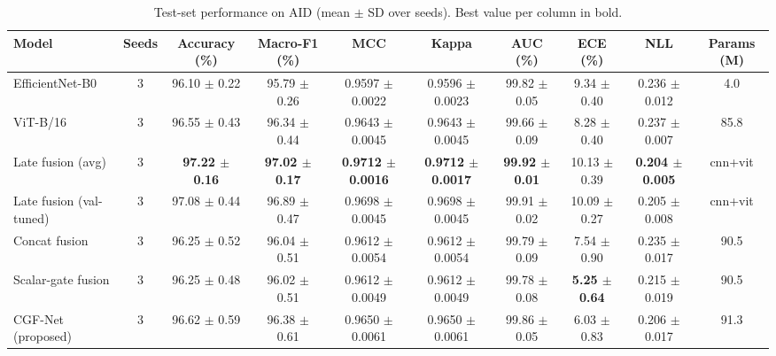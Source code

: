 \begin{table}[t]
\centering
\small
\caption{Test-set performance on AID (mean $\pm$ SD over seeds). Best value per column in bold.}
\label{tab:main}
\begin{tabular}{lccccccccc}
\toprule
Model & Seeds & Accuracy (\%) & Macro-F1 (\%) & MCC & Kappa & AUC (\%) & ECE (\%) & NLL & Params (M) \\
\midrule
EfficientNet-B0 & 3 & 96.10 $\pm$ 0.22 & 95.79 $\pm$ 0.26 & 0.9597 $\pm$ 0.0022 & 0.9596 $\pm$ 0.0023 & 99.82 $\pm$ 0.05 & 9.34 $\pm$ 0.40 & 0.236 $\pm$ 0.012 & 4.0 \\
ViT-B/16 & 3 & 96.55 $\pm$ 0.43 & 96.34 $\pm$ 0.44 & 0.9643 $\pm$ 0.0045 & 0.9643 $\pm$ 0.0045 & 99.66 $\pm$ 0.09 & 8.28 $\pm$ 0.40 & 0.237 $\pm$ 0.007 & 85.8 \\
Late fusion (avg) & 3 & \textbf{97.22 $\pm$ 0.16} & \textbf{97.02 $\pm$ 0.17} & \textbf{0.9712 $\pm$ 0.0016} & \textbf{0.9712 $\pm$ 0.0017} & \textbf{99.92 $\pm$ 0.01} & 10.13 $\pm$ 0.39 & \textbf{0.204 $\pm$ 0.005} & cnn+vit \\
Late fusion (val-tuned) & 3 & 97.08 $\pm$ 0.44 & 96.89 $\pm$ 0.47 & 0.9698 $\pm$ 0.0045 & 0.9698 $\pm$ 0.0045 & 99.91 $\pm$ 0.02 & 10.09 $\pm$ 0.27 & 0.205 $\pm$ 0.008 & cnn+vit \\
Concat fusion & 3 & 96.25 $\pm$ 0.52 & 96.04 $\pm$ 0.51 & 0.9612 $\pm$ 0.0054 & 0.9612 $\pm$ 0.0054 & 99.79 $\pm$ 0.09 & 7.54 $\pm$ 0.90 & 0.235 $\pm$ 0.017 & 90.5 \\
Scalar-gate fusion & 3 & 96.25 $\pm$ 0.48 & 96.02 $\pm$ 0.51 & 0.9612 $\pm$ 0.0049 & 0.9612 $\pm$ 0.0049 & 99.78 $\pm$ 0.08 & \textbf{5.25 $\pm$ 0.64} & 0.215 $\pm$ 0.019 & 90.5 \\
CGF-Net (proposed) & 3 & 96.62 $\pm$ 0.59 & 96.38 $\pm$ 0.61 & 0.9650 $\pm$ 0.0061 & 0.9650 $\pm$ 0.0061 & 99.86 $\pm$ 0.05 & 6.03 $\pm$ 0.83 & 0.206 $\pm$ 0.017 & 91.3 \\
\bottomrule
\end{tabular}
\end{table}